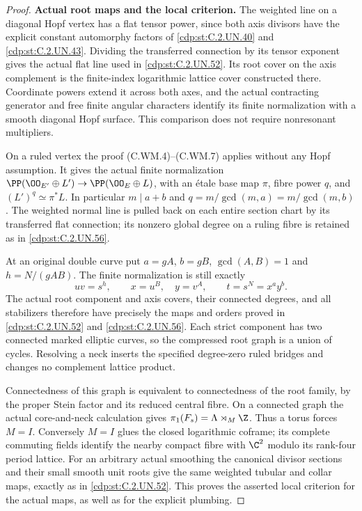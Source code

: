 \begin{proof}
\par\medskip\noindent\textbf{Actual root maps and the local criterion.}
The weighted line on a diagonal Hopf vertex has a flat tensor
power, since both axis divisors have the explicit constant
automorphy factors of \ref{cdp:st:C.2.UN.40} and \ref{cdp:st:C.2.UN.43}. Dividing the transferred
connection by its tensor exponent gives the actual flat line
used in \ref{cdp:st:C.2.UN.52}. Its root cover on the axis complement is the
finite-index logarithmic lattice cover constructed there.
Coordinate powers extend it across both axes, and the actual
contracting generator and free finite angular characters identify
its finite normalization with a smooth diagonal Hopf surface.
This comparison does not require nonresonant multipliers.

On a ruled vertex the proof (C.WM.4)--(C.WM.7) applies without
any Hopf assumption. It gives the actual finite normalization
$\PP(\OO_{E'}\oplus L')\to\PP(\OO_E\oplus L)$, with
an \'{e}tale base map $\pi$, fibre power $q$, and
$(L')^q\simeq\pi^*L$. In particular
$m\mid a+b$ and $q=m/\gcd(m,a)=m/\gcd(m,b)$.
The weighted normal line is pulled back on each entire section
chart by its transferred flat connection; its nonzero global
degree on a ruling fibre is retained as in \ref{cdp:st:C.2.UN.56}.

At an original double curve put
$a=gA$, $b=gB$, $\gcd(A,B)=1$ and
$h=N/(gAB)$. The finite normalization is still exactly
\[
             uv=s^h,\qquad x=u^B,\quad y=v^A,
             \qquad t=s^N=x^a y^b.
\tag{C.EW.1}\label{cdp:eq:C.EW.1}
\]
The actual root component and axis covers, their connected
degrees, and all stabilizers therefore have precisely the
maps and orders proved in \ref{cdp:st:C.2.UN.52} and \ref{cdp:st:C.2.UN.56}. Each strict component
has two connected marked elliptic curves, so the compressed
root graph is a union of cycles. Resolving a neck inserts the
specified degree-zero ruled bridges and changes no complement
lattice product.

Connectedness of this graph is equivalent to connectedness of
the root family, by the proper Stein factor and its reduced
central fibre. On a connected graph the actual core-and-neck
calculation gives $\pi_1(F_s)=\Lambda\rtimes_M\Z$.
Thus a torus forces $M=I$. Conversely $M=I$ glues the closed
logarithmic coframe; its complete commuting fields identify
the nearby compact fibre with $\C^2$ modulo its rank-four
period lattice. For an arbitrary actual smoothing the
canonical divisor sections and their small smooth unit roots
give the same weighted tubular and collar maps, exactly as
in \ref{cdp:st:C.2.UN.52}. This proves the asserted local criterion for the
actual maps, as well as for the explicit plumbing.


\end{proof}
